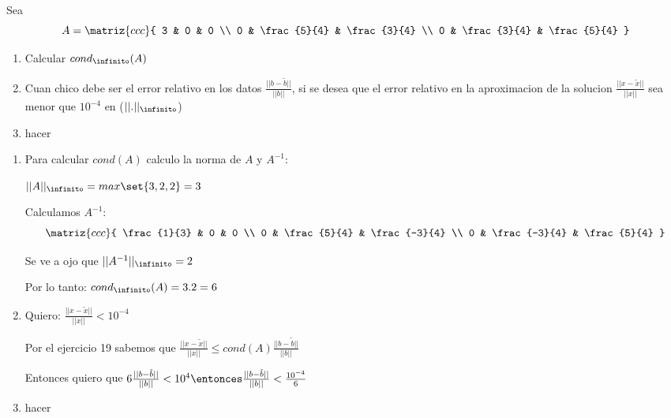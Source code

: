 \begin{enunciado}{\ejercicio}
Sea
$$
A =
\matriz{ccc}{
  3 & 0 & 0 \\ 
  0 & \frac{5}{4} & \frac{3}{4} \\
  0 & \frac{3}{4} & \frac{5}{4}
}$$
\begin{enumerate}[label=(\alph*)]
    \item Calcular $cond_\infinito(A)$
    \item
    Cuan chico debe ser el error relativo en los datos $\frac{||b-\tilde{b}||}{||b||}$, si se desea que el error relativo en 
    la aproximacion de la solucion $\frac{||x-\tilde{x}||}{||x||}$ sea menor que $10^{-4}$ en ($||.||_\infinito$)
    \item hacer
\end{enumerate}

\end{enunciado}

\medskip
\begin{enumerate}[label=(\alph*)]

\item Para calcular $cond(A)$ calculo la norma de $A$ y $A^{-1}$:

$||A||_\infinito = max\set{3,2,2} = 3$

Calculamos $A^{-1}$:
$$
\matriz{ccc}{
  \frac{1}{3} & 0 & 0 \\ 
  0 & \frac{5}{4} & \frac{-3}{4} \\
  0 & \frac{-3}{4} & \frac{5}{4}
}
$$

Se ve a ojo que $||A^{-1}||_\infinito = 2 $

Por lo tanto: $cond_\infinito(A) = 3.2 = 6$

\item
Quiero: $\frac{||x-\tilde{x}||}{||x||} < 10^{-4}$

Por el ejercicio 19 sabemos que $\frac{||x-\tilde{x}||}{||x||} \leq cond(A) \frac{||b-\tilde{b}||}{||b||}$

Entonces quiero que $6 \frac{||b-\tilde{b}||}{||b||} < 10^{4} \entonces \frac{||b-\tilde{b}||}{||b||} < \frac{10^{-4}}{6}$

\item hacer
\end{enumerate}

\begin{aportes}
    \item {}
\end{aportes}